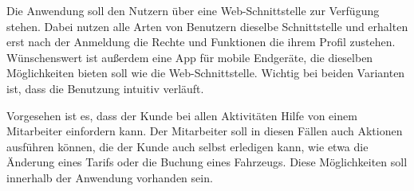 Die Anwendung soll den Nutzern über eine Web-Schnittstelle zur Verfügung stehen.
Dabei nutzen alle Arten von Benutzern dieselbe Schnittstelle und erhalten erst nach der Anmeldung die Rechte und Funktionen
die ihrem Profil zustehen.
Wünschenswert ist außerdem eine App für mobile Endgeräte, die dieselben Möglichkeiten bieten soll wie die
Web-Schnittstelle.
Wichtig bei beiden Varianten ist, dass die Benutzung intuitiv verläuft. \medskip

Vorgesehen ist es, dass der Kunde bei allen Aktivitäten Hilfe von einem Mitarbeiter einfordern kann.
Der Mitarbeiter soll in diesen Fällen auch Aktionen ausführen können, die der Kunde auch selbst erledigen kann,
wie etwa die Änderung eines Tarifs oder die Buchung eines Fahrzeugs.
Diese Möglichkeiten soll innerhalb der Anwendung vorhanden sein.
